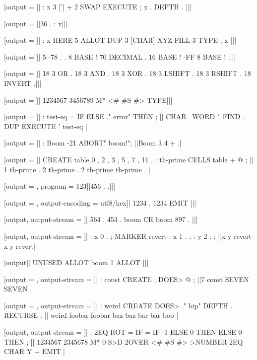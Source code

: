 [output = \result]|
  : x 3 ['] + 2 SWAP EXECUTE ; x . DEPTH .
|||
\typeout{\result}

[output = \result]|36 . : x|||
\typeout{\result}

[output = \result]|
  : x HERE 5 ALLOT DUP 3 [CHAR] XYZ FILL 3 TYPE ; x |||
\typeout{\result}

[output = \result]|
  5 -78 . .
  8 BASE ! 70 DECIMAL .
  16 BASE ! -FF 8 BASE ! .|||
\typeout{\result}

[output = \result]|
  18 3 OR .
  18 3 AND .
  18 3 XOR .
  18 3 LSHIFT .
  18 3 RSHIFT .
  18 INVERT .|||
\typeout{\result}

[output = \result]|
  1234567 3456789 M* <# #S #> TYPE|||
\typeout{\result}

[output = \result]|
  : test-eq = IF ELSE ." error" THEN ;
||
  CHAR \ WORD '\ FIND . DUP EXECUTE ' test-eq
|
\typeout{\result}

[output = \result]|
  : Boom -21 ABORT" boom!";
||Boom 3 4 + .|
\typeout{\result}

[output = \result]|
  CREATE table 0 , 2 , 3 , 5 , 7 , 11 ,
  : th-prime CELLS table + @ ;
||
  1 th-prime .
  2 th-prime .
  2 th-prime th-prime .
|
\typeout{\result}

[output = \result, program = {123}]|456 . .|||
\typeout{\result}

[output = \result, output-encoding = utf8/hex]|
  1234 . 1234 EMIT
|||
\typeout{\result}

[output, output-stream = \z@]|
  564 . 453 . boom CR boom 897 .
|||

[output, output-stream = \z@]|
  : x 0 . ;
  MARKER revert
  : x 1 . ;
  : y 2 . ;
||x y revert x y revert|

[output]|
  UNUSED ALLOT boom 1 ALLOT
|||

[output = \result, output-stream = \z@]|
  : const CREATE , DOES> @ ;
||7 const SEVEN SEVEN .|
\typeout{\result}

[output = \result, output-stream = \z@]|
  : weird CREATE DOES> ." bip" DEPTH . RECURSE ;
||
  weird foobar foobar baz baz bar bar boo
|
\typeout{\result}

[output, output-stream = \z@]|
  : 2EQ ROT = IF = IF -1 ELSE 0 THEN ELSE 0 THEN ;
||
  1234567 2345678 M*
  0 S>D
  2OVER <# #S #> >NUMBER
  2EQ CHAR Y + EMIT
|

